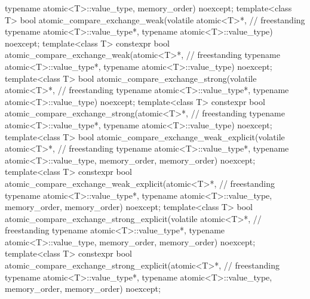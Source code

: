 \begin{codeblock}
{                                         typename atomic<T>::value_type,
                                         memory_order) noexcept;
  template<class T>
    bool atomic_compare_exchange_weak(volatile atomic<T>*,                          // freestanding
                                      typename atomic<T>::value_type*,
                                      typename atomic<T>::value_type) noexcept;
  template<class T>
    constexpr bool atomic_compare_exchange_weak(atomic<T>*,                         // freestanding
                                                typename atomic<T>::value_type*,
                                                typename atomic<T>::value_type) noexcept;
  template<class T>
    bool atomic_compare_exchange_strong(volatile atomic<T>*,                        // freestanding
                                        typename atomic<T>::value_type*,
                                        typename atomic<T>::value_type) noexcept;
  template<class T>
    constexpr bool atomic_compare_exchange_strong(atomic<T>*,                       // freestanding
                                                  typename atomic<T>::value_type*,
                                                  typename atomic<T>::value_type) noexcept;
  template<class T>
    bool atomic_compare_exchange_weak_explicit(volatile atomic<T>*,                 // freestanding
                                               typename atomic<T>::value_type*,
                                               typename atomic<T>::value_type,
                                               memory_order, memory_order) noexcept;
  template<class T>
    constexpr bool atomic_compare_exchange_weak_explicit(atomic<T>*,                // freestanding
                                                         typename atomic<T>::value_type*,
                                                         typename atomic<T>::value_type,
                                                         memory_order, memory_order) noexcept;
  template<class T>
    bool atomic_compare_exchange_strong_explicit(volatile atomic<T>*,               // freestanding
                                                 typename atomic<T>::value_type*,
                                                 typename atomic<T>::value_type,
                                                 memory_order, memory_order) noexcept;
  template<class T>
    constexpr bool atomic_compare_exchange_strong_explicit(atomic<T>*,              // freestanding
                                                           typename atomic<T>::value_type*,
                                                           typename atomic<T>::value_type,
                                                           memory_order, memory_order) noexcept;

}
\end{codeblock}

